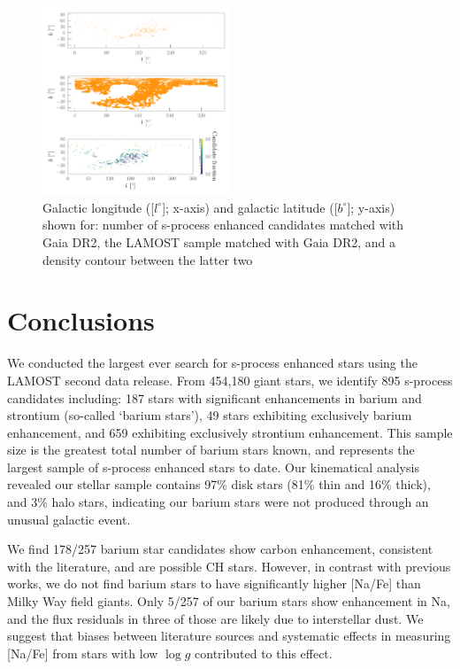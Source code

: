 \documentclass[a4paper,fleqn,usenatbib]{mnras}
\begin{document}
\begin{figure}
	\includegraphics[width=0.5\textwidth]{contour.pdf}
	\caption{Galactic longitude ([$l^{\circ}$]; x-axis) and galactic latitude ([$b^{\circ}$]; y-axis) shown for: number of s-process enhanced candidates matched with Gaia DR2, the LAMOST sample matched with Gaia DR2, and a density contour between the latter two}
	\label{fig:figure5}
\end{figure}

\section{Conclusions} \label{sec:con}

We conducted the largest ever search for s-process enhanced stars using the LAMOST second data release. From 454,180 giant stars, we identify 895 s-process candidates including: 187 stars with significant enhancements in barium and strontium (so-called `barium stars'), 49 stars exhibiting exclusively barium enhancement, and 659 exhibiting exclusively strontium enhancement. This sample size is the greatest total number of barium stars known, and represents the largest sample of s-process enhanced stars to date.  Our kinematical analysis revealed our stellar sample contains 97\% disk stars (81\% thin and 16\% thick), and 3\% halo stars, indicating our barium stars were not produced through an unusual galactic event. 

We find 178/257 barium star candidates show carbon enhancement, consistent with the literature, and are possible CH stars. However, in contrast with previous works, we do not find barium stars to have significantly higher [Na/Fe] than Milky Way field giants. Only 5/257 of our barium stars show enhancement in Na, and the flux residuals in three of those are likely due to interstellar dust. We suggest that biases between literature sources and systematic effects in measuring [Na/Fe] from stars with low $\log{g}$ contributed to this effect. 
\end{document}
